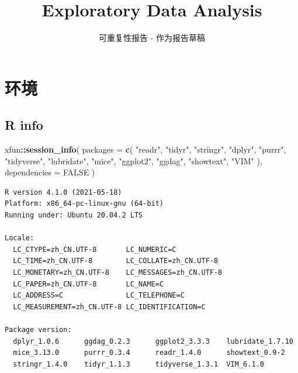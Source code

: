 \documentclass[]{ctexart}
\title{Exploratory Data Analysis}
\subtitle{可重复性报告 - 作为报告草稿}
\author{}
\date{\vspace{-2.5em}}
\newenvironment{Shaded}{\begin{snugshade}}{\end{snugshade}}
\newcommand{\DataTypeTok}[1]{\textcolor[rgb]{0.13,0.29,0.53}{#1}}
\newcommand{\KeywordTok}[1]{\textcolor[rgb]{0.13,0.29,0.53}{\textbf{#1}}}
\newcommand{\NormalTok}[1]{#1}
\newcommand{\OperatorTok}[1]{\textcolor[rgb]{0.81,0.36,0.00}{\textbf{#1}}}
\newcommand{\OtherTok}[1]{\textcolor[rgb]{0.56,0.35,0.01}{#1}}
\newcommand{\StringTok}[1]{\textcolor[rgb]{0.31,0.60,0.02}{#1}}
\begin{document}
\maketitle

{
\setcounter{tocdepth}{2}
\tableofcontents
}
\hypertarget{ux73afux5883}{%
\section{环境}\label{ux73afux5883}}

\hypertarget{r-info}{%
\subsection{R info}\label{r-info}}

\begin{Shaded}
\begin{Highlighting}[]
\NormalTok{xfun}\OperatorTok{::}\KeywordTok{session_info}\NormalTok{(}
        \DataTypeTok{packages =} \KeywordTok{c}\NormalTok{(}
                \StringTok{"readr"}\NormalTok{, }\StringTok{"tidyr"}\NormalTok{, }\StringTok{"stringr"}\NormalTok{, }\StringTok{"dplyr"}\NormalTok{, }\StringTok{"purrr"}\NormalTok{,}
                \StringTok{"tidyverse"}\NormalTok{, }\StringTok{"lubridate"}\NormalTok{, }\StringTok{"mice"}\NormalTok{,}
                \StringTok{"ggplot2"}\NormalTok{, }\StringTok{"ggdag"}\NormalTok{, }\StringTok{"showtext"}\NormalTok{, }\StringTok{"VIM"}
\NormalTok{        ), }\DataTypeTok{dependencies =} \OtherTok{FALSE}
\NormalTok{)}
\end{Highlighting}
\end{Shaded}

\begin{verbatim}
R version 4.1.0 (2021-05-18)
Platform: x86_64-pc-linux-gnu (64-bit)
Running under: Ubuntu 20.04.2 LTS

Locale:
  LC_CTYPE=zh_CN.UTF-8       LC_NUMERIC=C              
  LC_TIME=zh_CN.UTF-8        LC_COLLATE=zh_CN.UTF-8    
  LC_MONETARY=zh_CN.UTF-8    LC_MESSAGES=zh_CN.UTF-8   
  LC_PAPER=zh_CN.UTF-8       LC_NAME=C                 
  LC_ADDRESS=C               LC_TELEPHONE=C            
  LC_MEASUREMENT=zh_CN.UTF-8 LC_IDENTIFICATION=C       

Package version:
  dplyr_1.0.6      ggdag_0.2.3      ggplot2_3.3.3    lubridate_1.7.10
  mice_3.13.0      purrr_0.3.4      readr_1.4.0      showtext_0.9-2  
  stringr_1.4.0    tidyr_1.1.3      tidyverse_1.3.1  VIM_6.1.0       
\end{verbatim}
\end{document}
